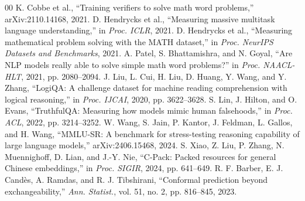 \documentclass[conference]{IEEEtran}
\begin{document}
\begin{thebibliography}{00}
 K. Cobbe et al., ``Training verifiers to solve math word problems,'' arXiv:2110.14168, 2021.
 D. Hendrycks et al., ``Measuring massive multitask language understanding,'' in \emph{Proc. ICLR}, 2021.
 D. Hendrycks et al., ``Measuring mathematical problem solving with the MATH dataset,'' in \emph{Proc. NeurIPS Datasets and Benchmarks}, 2021.
 A. Patel, S. Bhattamishra, and N. Goyal, ``Are NLP models really able to solve simple math word problems?'' in \emph{Proc. NAACL-HLT}, 2021, pp. 2080--2094.
 J. Liu, L. Cui, H. Liu, D. Huang, Y. Wang, and Y. Zhang, ``LogiQA: A challenge dataset for machine reading comprehension with logical reasoning,'' in \emph{Proc. IJCAI}, 2020, pp. 3622--3628.
 S. Lin, J. Hilton, and O. Evans, ``TruthfulQA: Measuring how models mimic human falsehoods,'' in \emph{Proc. ACL}, 2022, pp. 3214--3252.
 W. Wang, S. Jain, P. Kantor, J. Feldman, L. Gallos, and H. Wang, ``MMLU-SR: A benchmark for stress-testing reasoning capability of large language models,'' arXiv:2406.15468, 2024.
 S. Xiao, Z. Liu, P. Zhang, N. Muennighoff, D. Lian, and J.-Y. Nie, ``C-Pack: Packed resources for general Chinese embeddings,'' in \emph{Proc. SIGIR}, 2024, pp. 641--649.
 R. F. Barber, E. J. Cand\`es, A. Ramdas, and R. J. Tibshirani, ``Conformal prediction beyond exchangeability,'' \emph{Ann. Statist.}, vol. 51, no. 2, pp. 816--845, 2023.
\end{thebibliography}
\end{document}
